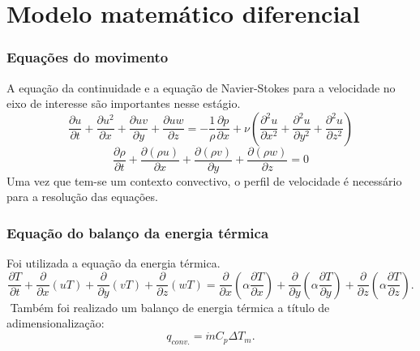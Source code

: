 \documentclass[xcolor=dvipsnames,10pt,aspectratio=169]{beamer}
\begin{document}
	

	
	\section{Modelo matemático diferencial}
	
	
	
	
		
		\begin{frame}
		\frametitle{Equações do movimento}
		A equação da continuidade e a equação de Navier-Stokes para a velocidade no eixo de interesse são importantes nesse estágio.
		\begin{equation}
		\frac{\partial u}{\partial t} + \frac{\partial u^2}{\partial x} + \frac{\partial uv}{\partial y} + \frac{\partial uw}{\partial z} = - \frac{1}{\rho} \frac{\partial {p}}{\partial x} + \nu \left( \frac{\partial^2 u}{\partial x^2} + \frac{\partial^2 u}{\partial y^2} + \frac{\partial^2 u}{\partial z^2}   \right)
		\end{equation}
		\begin{equation}
		\frac{\partial \rho}{\partial t} +  \frac{\partial (\rho u)}{\partial x} + \frac{\partial (\rho v)}{\partial y} + \frac{\partial (\rho w)}{\partial z} = 0
		\end{equation}
    Uma vez que tem-se um contexto convectivo, o perfil de velocidade é necessário para a resolução das equações.
		\end{frame}

		



		\begin{frame}
      \frametitle{Equação do balanço da energia térmica}
      Foi utilizada a equação da energia térmica.
      \begin{equation}
      \frac{\partial T}{\partial t} + {\frac{\partial{}}{\partial{x}} (uT)} + {\frac{\partial{}}{\partial{y}} (vT)} + {\frac{\partial{}}{\partial{z}} (wT)}
      =
      {\frac{\partial{}}{\partial{x}}} \left(\alpha {\frac{\partial{T}}{\partial{x}}} \right) +
      {\frac{\partial{}}{\partial{y}}} \left(\alpha {\frac{\partial{T}}{\partial{y}}} \right) +
      {\frac{\partial{}}{\partial{z}}} \left(\alpha {\frac{\partial{T}}{\partial{z}}} \right) .
      \end{equation}
      $ $
      Também foi realizado um balanço de energia térmica a título de adimensionalização:
      \begin{equation}\label{c_h_e}
      q_{conv.} = \dot{m} C_p \Delta T_m.
      \end{equation}
      $ $
		\end{frame}
\end{document}
